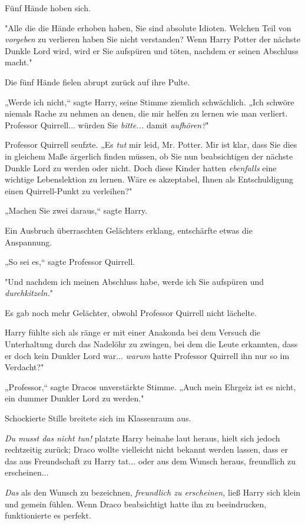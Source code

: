 {Fünf Hände hoben sich.

"Alle die die Hände erhoben haben, Sie sind absolute Idioten. Welchen Teil von \emph{vorgeben} zu verlieren haben Sie nicht verstanden? Wenn Harry Potter der nächste Dunkle Lord wird, wird er Sie aufspüren und töten, nachdem er seinen Abschluss macht."

Die fünf Hände fielen abrupt zurück auf ihre Pulte.

„Werde ich nicht,“ sagte Harry, seine Stimme ziemlich schwächlich. „Ich schwöre niemals Rache zu nehmen an denen, die mir helfen zu lernen wie man verliert. Professor Quirrell... würden Sie \emph{bitte...} damit \emph{aufhören?}"

Professor Quirrell seufzte. „Es \emph{tut} mir leid, Mr. Potter. Mir ist klar, dass Sie dies in gleichem Maße ärgerlich finden müssen, ob Sie nun beabsichtigen der nächste Dunkle Lord zu werden oder nicht. Doch diese Kinder hatten \emph{ebenfalls} eine wichtige Lebenslektion zu lernen. Wäre es akzeptabel, Ihnen als Entschuldigung einen Quirrell-Punkt zu verleihen?"

„Machen Sie zwei daraus,“ sagte Harry.

Ein Ausbruch überraschten Gelächters erklang, entschärfte etwas die Anspannung.

„So sei es,“ sagte Professor Quirrell.

"Und nachdem ich meinen Abschluss habe, werde ich Sie aufspüren und \emph{durchkitzeln.}"

Es gab noch mehr Gelächter, obwohl Professor Quirrell nicht lächelte.

Harry fühlte sich als ränge er mit einer Anakonda bei dem Versuch die Unterhaltung durch das Nadelöhr zu zwingen, bei dem die Leute erkannten, dass er doch kein Dunkler Lord war... \emph{warum} hatte Professor Quirrell ihn nur so im Verdacht?"

„Professor,“ sagte Dracos unverstärkte Stimme. „Auch mein Ehrgeiz ist es nicht, ein dummer Dunkler Lord zu werden."

Schockierte Stille breitete sich im Klassenraum aus.

\emph{Du musst das nicht tun!} platzte Harry beinahe laut heraus, hielt sich jedoch rechtzeitig zurück; Draco wollte vielleicht nicht bekannt werden lassen, dass er das aus Freundschaft zu Harry tat... oder aus dem Wunsch heraus, freundlich zu erscheinen...

\emph{Das} als den Wunsch zu bezeichnen, \emph{freundlich zu erscheinen,} ließ Harry sich klein und gemein fühlen. Wenn Draco beabsichtigt hatte ihn zu beeindrucken, funktionierte es perfekt.

}
